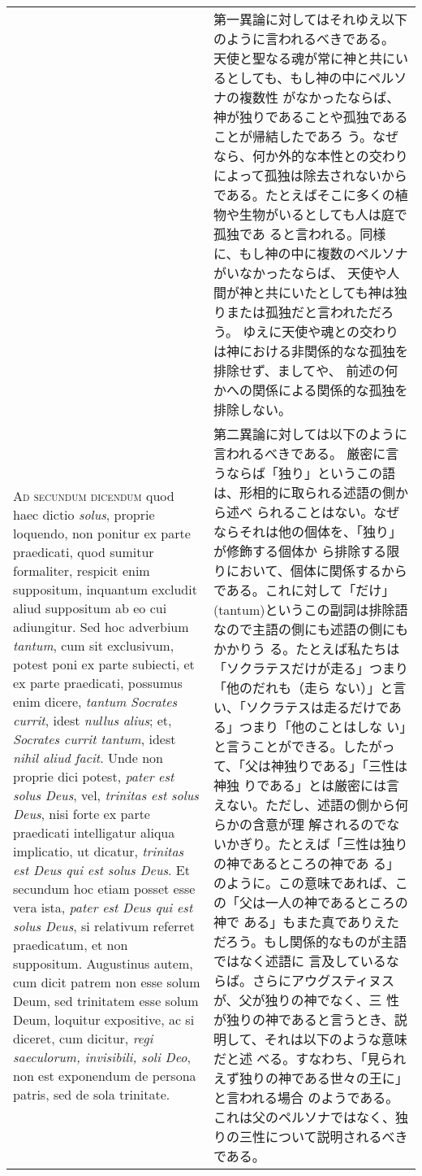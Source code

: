 \documentclass[10pt]{jsarticle} %
\begin{document}
\begin{longtable}{p{21em}p{21em}}
&

第一異論に対してはそれゆえ以下のように言われるべきである。
天使と聖なる魂が常に神と共にいるとしても、もし神の中にペルソナの複数性
 がなかったならば、神が独りであることや孤独であることが帰結したであろ
 う。なぜなら、何か外的な本性との交わりによって孤独は除去されないから
 である。たとえばそこに多くの植物や生物がいるとしても人は庭で孤独であ
 ると言われる。同様に、もし神の中に複数のペルソナがいなかったならば、
 天使や人間が神と共にいたとしても神は独りまたは孤独だと言われただろう。
 ゆえに天使や魂との交わりは神における非関係的なな孤独を排除せず、ましてや、
 前述の何かへの関係による関係的な孤独を排除しない。


\\




{\scshape Ad secundum dicendum} quod haec dictio {\itshape solus}, proprie loquendo, non
 ponitur ex parte praedicati, quod sumitur formaliter, respicit enim
 suppositum, inquantum excludit aliud suppositum ab eo cui
 adiungitur. Sed hoc adverbium {\itshape tantum}, cum sit exclusivum, potest poni
 ex parte subiecti, et ex parte praedicati, possumus enim dicere,
 {\itshape tantum Socrates currit}, idest {\itshape nullus alius}; et, {\itshape Socrates currit
 tantum}, idest {\itshape nihil aliud facit}. Unde non proprie dici potest, {\itshape pater
 est solus Deus}, vel, {\itshape trinitas est solus Deus}, nisi forte ex parte
 praedicati intelligatur aliqua implicatio, ut dicatur, {\itshape trinitas est
 Deus qui est solus Deus}. Et secundum hoc etiam posset esse vera ista,
 {\itshape pater est Deus qui est solus Deus}, si relativum referret praedicatum,
 et non suppositum. Augustinus autem, cum dicit patrem non esse solum
 Deum, sed trinitatem esse solum Deum, loquitur expositive, ac si
 diceret, cum dicitur, {\itshape regi saeculorum, invisibili, soli Deo}, non est
 exponendum de persona patris, sed de sola trinitate.

&

第二異論に対しては以下のように言われるべきである。
厳密に言うならば「独り」というこの語は、形相的に取られる述語の側から述べ
られることはない。なぜならそれは他の個体を、「独り」が修飾する個体か
ら排除する限りにおいて、個体に関係するからである。これに対して「だけ」
 (tantum)というこの副詞は排除語なので主語の側にも述語の側にもかかりう
 る。たとえば私たちは「ソクラテスだけが走る」つまり「他のだれも（走ら
 ない）」と言い、「ソクラテスは走るだけである」つまり「他のことはしな
 い」と言うことができる。したがって、「父は神独りである」「三性は神独
 りである」とは厳密には言えない。ただし、述語の側から何らかの含意が理
 解されるのでないかぎり。たとえば「三性は独りの神であるところの神であ
 る」のように。この意味であれば、この「父は一人の神であるところの神で
 ある」もまた真でありえただろう。もし関係的なものが主語ではなく述語に
 言及しているならば。さらにアウグスティヌスが、父が独りの神でなく、三
 性が独りの神であると言うとき、説明して、それは以下のような意味だと述
 べる。すなわち、「見られえず独りの神である世々の王に」と言われる場合
 のようである。これは父のペルソナではなく、独りの三性について説明されるべき
 である。


\end{longtable}
\end{document}
